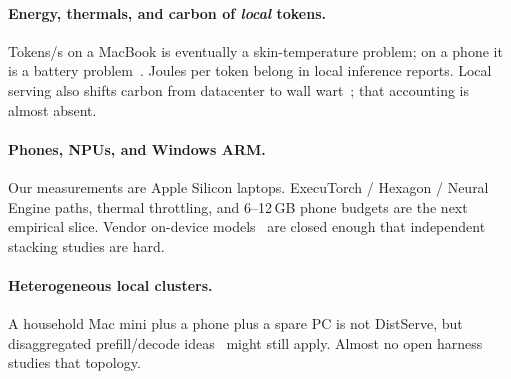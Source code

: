 \paragraph{Energy, thermals, and carbon of \emph{local} tokens.}
Tokens/s on a MacBook is eventually a skin-temperature problem; on a phone it is a battery problem~\citep{luccioni2024power}. Joules per token belong in local inference reports. Local serving also shifts carbon from datacenter to wall wart~\citep{patterson2021carbon}; that accounting is almost absent.

\paragraph{Phones, NPUs, and Windows ARM.}
Our measurements are Apple Silicon laptops. ExecuTorch / Hexagon / Neural Engine paths, thermal throttling, and 6--12\,GB phone budgets are the next empirical slice. Vendor on-device models~\citep{gunter2024apple} are closed enough that independent stacking studies are hard.

\paragraph{Heterogeneous local clusters.}
A household Mac mini plus a phone plus a spare PC is not DistServe, but disaggregated prefill/decode ideas~\citep{patel2024splitwise} might still apply. Almost no open harness studies that topology.

